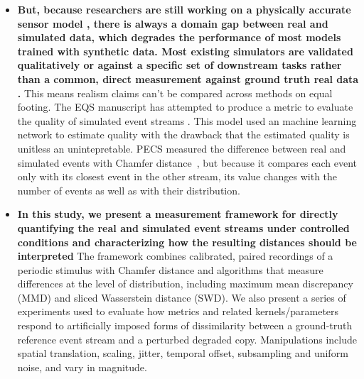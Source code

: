 \begin{itemize}
  \item \textbf{But, because researchers are still working on a physically accurate sensor model \cite{graca2025sensormodel},  there is always a domain gap between real and simulated data, which degrades the performance of most models trained with synthetic data. Most existing simulators are validated qualitatively or against a specific set of downstream tasks rather than a common, direct measurement against ground truth real data \cite{tan2025carla,chen2024instance}.} This means realism claims can't be compared across methods on equal footing. The EQS manuscript has attempted to produce a metric to evaluate the quality of simulated event streams \cite{chanda2025eqs}. This model used an machine learning network to estimate quality with the drawback that the estimated quality is unitless an unintepretable. PECS measured the difference between real and simulated events with Chamfer distance~\cite{han2024pecs}, but because it compares each event only with its closest event in the other stream, its value changes with the number of events as well as with their distribution.
  


  

  \item \textbf{In this study, we present a measurement framework for directly quantifying the real and simulated event streams under controlled conditions and characterizing how the resulting distances should be interpreted} The framework combines calibrated, paired recordings of a periodic stimulus with Chamfer distance and algorithms that measure differences at the level of distribution, including maximum mean discrepancy (MMD) and sliced Wasserstein distance (SWD). We also present a series of experiments used to evaluate how metrics and related kernels/parameters respond to artificially imposed forms of dissimilarity between a ground-truth reference event stream and a perturbed degraded copy. Manipulations include spatial translation, scaling, jitter, temporal offset, subsampling and uniform noise, and vary in magnitude.
  

\end{itemize}

